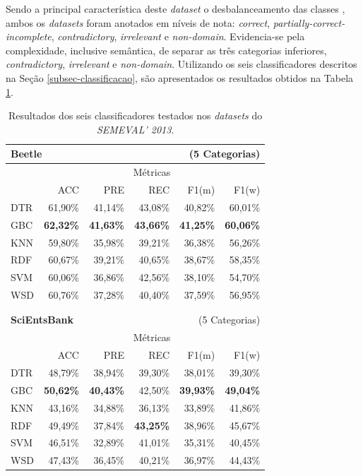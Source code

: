 Sendo a principal característica deste \textit{dataset} o desbalanceamento das classes \cite{dzikovska2013}, ambos os \textit{datasets} foram anotados em níveis de nota: \textit{correct}, \textit{partially-correct-incomplete}, \textit{contradictory}, \textit{irrelevant} e \textit{non-domain}. Evidencia-se pela complexidade, inclusive semântica, de separar as três categorias inferiores, \textit{contradictory}, \textit{irrelevant} e \textit{non-domain}. Utilizando os seis classificadores descritos na Seção \ref{subsec-classificacao}, são apresentados os resultados obtidos na Tabela \ref{tab-SEMEVAL}.

\begin{table}
\centering
\caption{Resultados dos seis classificadores testados nos \textit{datasets} do \textit{SEMEVAL' 2013}.}
\label{tab-SEMEVAL}
\begin{tabular}{l r r r r r}
    \hline
    \multicolumn{4}{l}{\textbf{Beetle}} &  \multicolumn{2}{r}{(5 Categorias)} \\ \hline
    & \multicolumn{5}{c}{M{\'e}tricas} \\ \cline{2-6}

     & ACC & PRE & REC & F1(m) & F1(w) \\ \cline{2-6}
    DTR & 61,90\% & 41,14\% & 43,08\% & 40,82\% & 60,01\% \\
    GBC & \textbf{62,32\%} & \textbf{41,63\%} & \textbf{43,66\%} & \textbf{41,25\%} & \textbf{60,06\%} \\
    KNN & 59,80\% & 35,98\% & 39,21\% & 36,38\% & 56,26\% \\
    RDF & 60,67\% & 39,21\% & 40,65\% & 38,67\% & 58,35\% \\
    SVM & 60,06\% & 36,86\% & 42,56\% & 38,10\% & 54,70\% \\
    WSD & 60,76\% & 37,28\% & 40,40\% & 37,59\% & 56,95\% \\

    \hline
    \\
    \\
    \hline
    \multicolumn{4}{l}{\textbf{SciEntsBank}} &  \multicolumn{2}{r}{(5 Categorias)} \\ \hline
     & \multicolumn{5}{c}{M{\'e}tricas} \\ \cline{2-6}

     & ACC & PRE & REC & F1(m) & F1(w) \\ \cline{2-6}
    DTR & 48,79\% & 38,94\% & 39,30\% & 38,01\% & 39,30\% \\
    GBC & \textbf{50,62\%} & \textbf{40,43\%} & 42,50\% & \textbf{39,93\%} & \textbf{49,04\%} \\
    KNN & 43,16\% & 34,88\% & 36,13\% & 33,89\% & 41,86\% \\
    RDF & 49,49\% & 37,84\% & \textbf{43,25\%} & 38,96\% & 45,67\% \\
    SVM & 46,51\% & 32,89\% & 41,01\% & 35,31\% & 40,45\% \\
    WSD & 47,43\% & 36,45\% & 40,21\% & 36,97\% & 44,43\% \\
    \hline
    \hline
\end{tabular}
\end{table}

